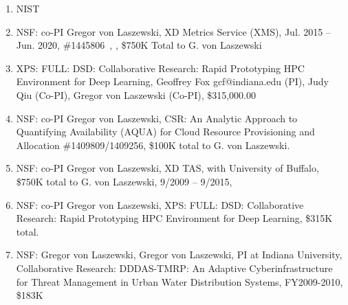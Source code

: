 \documentclass{article}
\renewcommand{\url}[1]{\href{#1}{\faExternalLink}}
\begin{document}
\begin{enumerate}


\item{NIST}
  
\item  NSF: co-PI Gregor von Laszewski, XD Metrics Service (XMS), Jul. 2015 – Jun. 2020, \#1445806 , \url{https://www.nsf.gov/awardsearch/showAward?AWD_ID=1445806}, \$750K Total to G. von Laszewski
\item   XPS: FULL: DSD: Collaborative Research: Rapid Prototyping HPC Environment for Deep Learning, Geoffrey Fox gcf@indiana.edu (PI), Judy Qiu (Co-PI), Gregor von Laszewski (Co-PI), 	\$315,000.00
\item  NSF: co-PI Gregor von Laszewski, CSR: An Analytic Approach to Quantifying Availability (AQUA) for Cloud Resource Provisioning and Allocation \#1409809/1409256, \$100K total to G. von Laszewski. 

\item  NSF: co-PI Gregor von Laszewski, XD TAS, with University of Buffalo, \$750K total to G. von Laszewski, 9/2009 – 9/2015, \url{http://www.nsf.gov/awardsearch/showAward?AWD_ID=1025159}

\item  NSF: co-PI Gregor von Laszewski, XPS: FULL: DSD: Collaborative Research: Rapid Prototyping HPC Environment for Deep Learning, \$315K total.
  \url{http://www.nsf.gov/awardsearch/showAward?AWD_ID=\#1439007}

\item  NSF: Gregor von Laszewski, Gregor von Laszewski, PI at Indiana University, Collaborative Research: DDDAS-TMRP: An Adaptive Cyberinfrastructure for Threat Management in Urban Water Distribution Systems, FY2009-2010, \$183K
  

\end{enumerate}
\end{document}
